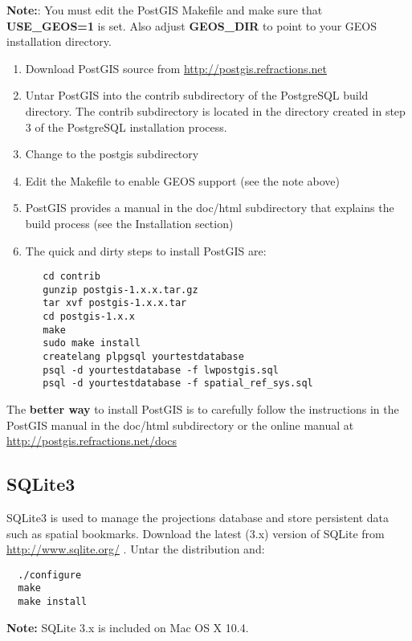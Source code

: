 \textbf{Note:}: You must edit the PostGIS Makefile and make sure that \textbf{USE\_GEOS=1}
is set. Also adjust \textbf{GEOS\_DIR} to point to your GEOS installation directory.
  
\begin{enumerate}
\item Download PostGIS source from \url{http://postgis.refractions.net} \cite{PostGISweb} 
\item Untar PostGIS into the contrib subdirectory of the PostgreSQL build
directory. The contrib subdirectory is located in the directory created in
step 3 of the PostgreSQL installation process.
\item Change to the postgis subdirectory
\item Edit the Makefile to enable GEOS support (see the note above)
\item PostGIS provides a manual in the doc/html subdirectory that explains
the build process (see the Installation section)
\item The quick and dirty steps to install PostGIS are:
  
\begin{verbatim}
   cd contrib
   gunzip postgis-1.x.x.tar.gz 
   tar xvf postgis-1.x.x.tar 
   cd postgis-1.x.x 
   make 
   sudo make install 
   createlang plpgsql yourtestdatabase 
   psql -d yourtestdatabase -f lwpostgis.sql 
   psql -d yourtestdatabase -f spatial_ref_sys.sql 
\end{verbatim}
\end{enumerate}

The \textbf{better way} to install PostGIS is to carefully follow the
instructions in the PostGIS manual in the doc/html subdirectory or the
online manual at \url{http://postgis.refractions.net/docs}

% 
%
\subsection{SQLite3}\label{label_sqlite}

SQLite3 is used to manage the projections database and store persistent data
such as spatial bookmarks. Download the latest (3.x) version of SQLite from
\url{http://www.sqlite.org/} \cite{SQliteweb}. Untar the distribution and:

\begin{verbatim}
  ./configure
  make
  make install
\end{verbatim}

\textbf{Note:} SQLite 3.x is included on Mac OS X 10.4.

